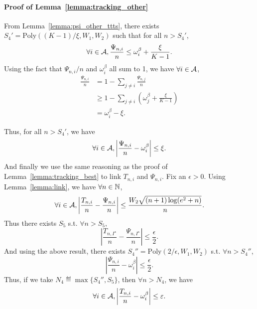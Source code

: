 \paragraph{Proof of Lemma~\ref{lemma:tracking_other}} 

From Lemma~\ref{lemma:psi_other_ttts}, there exists $S_4' = \text{Poly}((K-1)/\xi,W_1,W_2)$ such that for all $n > S_4'$,
\[
    \forall i\in\mathcal{A}, \frac{\Psi_{n,i}}{n} \leq \omega_i^\beta + \frac{\xi}{K-1}.
\]
Using the fact that $\Psi_{n,i}/n$ and $\omega_{i}^\beta$ all sum to 1, we have $\forall i \in \mathcal{A}$,
\begin{align*}
    \frac{\Psi_{n,i}}{n} &= 1 - \sum_{j\neq i} \frac{\Psi_{n,j}}{n}\\
                         &\geq 1 - \sum_{j\neq i} \left(\omega_j^\beta + \frac{\xi}{K-1}\right)\\
                         &= \omega_i^\beta - \xi.
\end{align*}

Thus, for all $n > S_4'$, we have
\[
    \forall i\in\mathcal{A}, \left| \frac{\Psi_{n,i}}{n} - \omega_i^\beta \right| \leq \xi.
\]
And finally we use the same reasoning as the proof of Lemma~\ref{lemma:tracking_best} to link $T_{n,i}$ and $\Psi_{n,i}$. Fix an $\epsilon > 0$. Using Lemma~\ref{lemma:link}, we have $\forall n\in{\mathbb N}$,
\[
    \forall i\in\mathcal{A}, \left|\frac{T_{n,i}}{n}-\frac{\Psi_{n,i}}{n}\right| \leq \frac{W_2\sqrt{(n+1)\log(e^2+n)}}{n}.
\]
Thus there exists $S_5$ s.t. $\forall n > S_5$,
\[
    \left|\frac{T_{n,I^\star}}{n}-\frac{\Psi_{n,I^\star}}{n}\right| \leq \frac{\epsilon}{2}.
\]
And using the above result, there exists $S_4'' = \text{Poly}(2/\epsilon,W_1,W_2)$ s.t. $\forall n > S_4''$,
\[
    \left|\frac{\Psi_{n,i}}{n} - \omega_i^\beta\right| \leq \frac{\epsilon}{2}.
\]
Thus, if we take $N_4 \eqdef \max\{S_4'',S_5\}$, then $\forall n > N_4$, we have
\[
    \forall i\in\mathcal{A}, \left|\frac{T_{n,i}}{n} - \omega_i^\beta\right| \leq \varepsilon.
\]

\hfill\BlackBox\\[2mm]
